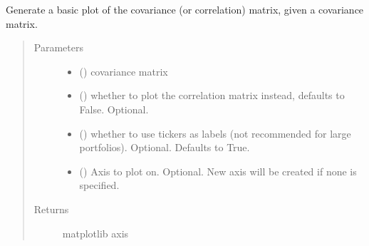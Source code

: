 \documentclass[letterpaper,10pt,english]{sphinxmanual}
\begin{document}
\begin{fulllineitems}
\label{\detokenize{dalio.util:dalio.util.plot_covariance}}
Generate a basic plot of the covariance (or correlation) matrix,
given a covariance matrix.
\begin{quote}\begin{description}
\item[{Parameters}] \leavevmode\begin{itemize}
\item {} 
 (\sphinxstyleliteralemphasis{\sphinxupquote{, }}) \textendash{} covariance matrix

\item {} 
 () \textendash{} whether to plot the correlation matrix
instead, defaults to False. Optional.

\item {} 
 () \textendash{} whether to use tickers as labels (not
recommended for large portfolios). Optional. Defaults to True.

\item {} 
 (\sphinxstyleliteralemphasis{\sphinxupquote{, }}) \textendash{} Axis to plot on. Optional. New axis will
be created if none is specified.

\end{itemize}

\item[{Returns}] \leavevmode
matplotlib axis

\end{description}\end{quote}

\end{fulllineitems}

\end{document}
